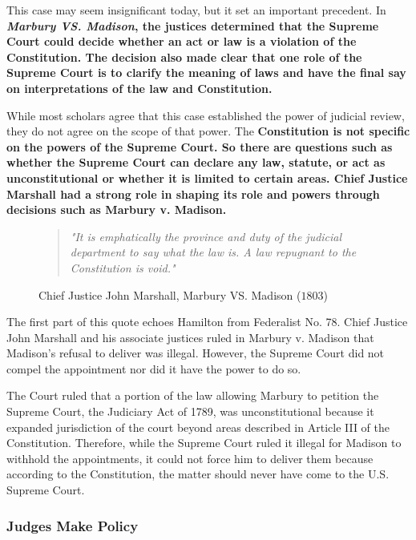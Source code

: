 This case may seem insignificant today, but it set an important precedent. In \bf{\it{Marbury VS. Madison}}, the justices
determined that the Supreme Court could decide whether an act or law is a violation of the Constitution. The decision
also made clear that one role of the Supreme Court is to clarify the meaning of laws and have the final say on interpretations
of the law and Constitution.

While most scholars agree that this case established the power of judicial review, they do not agree on the scope of that power.
The \bf{Constitution} is not specific on the powers of the Supreme Court. So there are questions such as whether the Supreme Court
can declare any law, statute, or act as unconstitutional or whether it is limited to certain areas. Chief Justice Marshall had a
strong role in shaping its role and powers through decisions such as Marbury v. Madison.

\begin{figure}[h]
    \begin{quote}
        \it{"It is emphatically the province and duty of the judicial department to say what the law is. A law repugnant to the Constitution is void."}
    \end{quote}
    \caption{Chief Justice John Marshall, Marbury VS. Madison ($1803$)}
\end{figure}

The first part of this quote echoes Hamilton from Federalist No. 78. Chief Justice John Marshall and his associate justices ruled in Marbury v. Madison that Madison's refusal to deliver was illegal. However, the Supreme Court did not compel the appointment nor did it have the power to do so.

The Court ruled that a portion of the law allowing Marbury to petition the Supreme Court, the Judiciary Act of 1789, was unconstitutional because it expanded jurisdiction of the court beyond areas described in Article III of the Constitution. Therefore, while the Supreme Court ruled it illegal for Madison to withhold the appointments, it could not force him to deliver them because according to the Constitution, the matter should never have come to the U.S. Supreme Court.

\subsubsection*{Judges Make Policy}

\newpage
